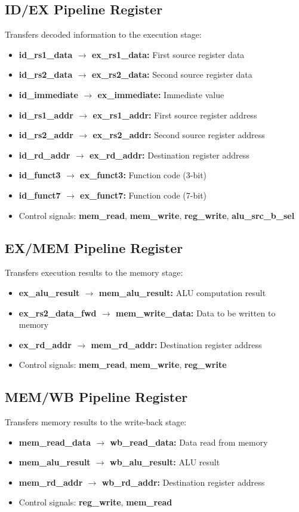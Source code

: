 \documentclass[conference]{IEEEtran}
\begin{document}
\subsection{ID/EX Pipeline Register}
Transfers decoded information to the execution stage:
\begin{itemize}
    \item \textbf{id\_rs1\_data $\rightarrow$ ex\_rs1\_data:} First source register data
    \item \textbf{id\_rs2\_data $\rightarrow$ ex\_rs2\_data:} Second source register data
    \item \textbf{id\_immediate $\rightarrow$ ex\_immediate:} Immediate value
    \item \textbf{id\_rs1\_addr $\rightarrow$ ex\_rs1\_addr:} First source register address
    \item \textbf{id\_rs2\_addr $\rightarrow$ ex\_rs2\_addr:} Second source register address
    \item \textbf{id\_rd\_addr $\rightarrow$ ex\_rd\_addr:} Destination register address
    \item \textbf{id\_funct3 $\rightarrow$ ex\_funct3:} Function code (3-bit)
    \item \textbf{id\_funct7 $\rightarrow$ ex\_funct7:} Function code (7-bit)
    \item Control signals: \textbf{mem\_read}, \textbf{mem\_write}, \textbf{reg\_write}, \textbf{alu\_src\_b\_sel}
\end{itemize}

\subsection{EX/MEM Pipeline Register}
Transfers execution results to the memory stage:
\begin{itemize}
    \item \textbf{ex\_alu\_result $\rightarrow$ mem\_alu\_result:} ALU computation result
    \item \textbf{ex\_rs2\_data\_fwd $\rightarrow$ mem\_write\_data:} Data to be written to memory
    \item \textbf{ex\_rd\_addr $\rightarrow$ mem\_rd\_addr:} Destination register address
    \item Control signals: \textbf{mem\_read}, \textbf{mem\_write}, \textbf{reg\_write}
\end{itemize}

\subsection{MEM/WB Pipeline Register}
Transfers memory results to the write-back stage:
\begin{itemize}
    \item \textbf{mem\_read\_data $\rightarrow$ wb\_read\_data:} Data read from memory
    \item \textbf{mem\_alu\_result $\rightarrow$ wb\_alu\_result:} ALU result
    \item \textbf{mem\_rd\_addr $\rightarrow$ wb\_rd\_addr:} Destination register address
    \item Control signals: \textbf{reg\_write}, \textbf{mem\_read}
\end{itemize}
\end{document}
